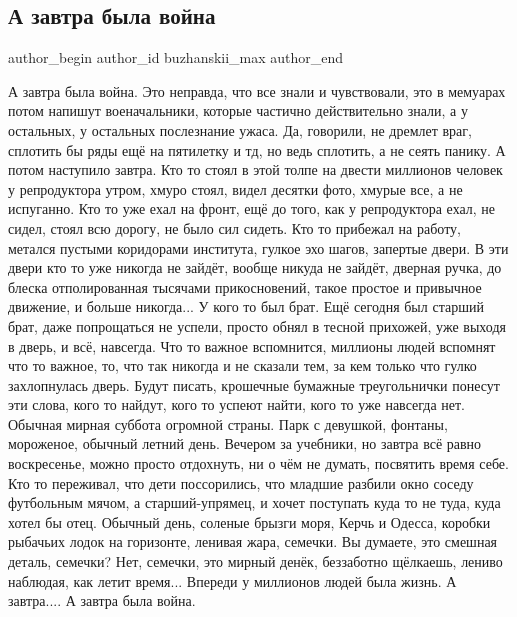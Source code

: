  
 
 
 
 
 
\subsection{А завтра была война}
\label{sec:21_06_2021.fb.buzhanskii_max.1.vojna_22_06_1941}
\ifcmt
 author_begin
   author_id buzhanskii_max
 author_end
\fi

\obeycr
А завтра была война.
Это неправда, что все знали и чувствовали, это в мемуарах потом напишут военачальники, которые частично действительно знали, а у остальных, у остальных послезнание ужаса.
Да, говорили, не дремлет враг, сплотить бы ряды ещё на пятилетку и тд, но ведь сплотить, а не сеять панику.
А потом наступило завтра.
Кто то стоял в этой толпе на двести миллионов человек у репродуктора утром, хмуро стоял, видел десятки фото, хмурые все, а не испуганно.
Кто то уже ехал на фронт, ещё до того, как у репродуктора ехал, не сидел, стоял всю дорогу, не было сил сидеть.
Кто то прибежал на работу, метался пустыми коридорами института, гулкое эхо шагов, запертые двери.
В эти двери кто то уже никогда не зайдёт, вообще никуда не зайдёт, дверная ручка, до блеска отполированная тысячами прикосновений, такое простое и привычное движение, и больше никогда...
У кого то был брат.
Ещё сегодня был старший брат, даже попрощаться не успели, просто обнял в тесной прихожей, уже выходя в дверь, и всё, навсегда.
Что то важное вспомнится, миллионы людей вспомнят что то важное, то, что так никогда и не сказали тем, за кем только что гулко захлопнулась дверь.
Будут писать, крошечные бумажные треугольнички понесут эти слова, кого то найдут, кого то успеют найти, кого то уже навсегда нет.
Обычная мирная суббота огромной страны.
Парк с девушкой, фонтаны, мороженое, обычный летний день.
Вечером за учебники, но завтра всё равно воскресенье, можно просто отдохнуть, ни о чём не думать, посвятить время себе.
Кто то переживал, что дети поссорились, что младшие разбили окно соседу футбольным мячом, а старший-упрямец, и хочет поступать куда то не туда, куда хотел бы отец.
Обычный день, соленые брызги моря, Керчь и Одесса, коробки рыбачьих лодок на горизонте, ленивая жара, семечки.
Вы думаете, это смешная деталь, семечки?
Нет, семечки, это мирный денёк, беззаботно щёлкаешь, лениво наблюдая, как летит время...
Впереди у миллионов людей была жизнь.
А завтра....
А завтра была война.
\restorecr

